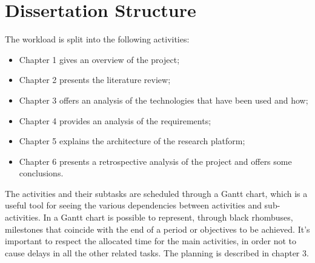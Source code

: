 \section{Dissertation Structure}
The workload is split into the following activities:
\begin{itemize}
	\item Chapter 1 gives an overview of the project;
	\item Chapter 2 presents the literature review;
	\item Chapter 3 offers an analysis of the technologies that have been used and how;
	\item Chapter 4 provides an analysis of the requirements;
	\item Chapter 5 explains the architecture of the research platform;
	\item Chapter 6 presents a retrospective analysis of the project and offers some conclusions.
\end{itemize}
The activities and their subtasks are scheduled through a Gantt chart, which is a useful tool for seeing the various dependencies between activities and sub-activities. In a Gantt chart is possible to represent, through black rhombuses, milestones that coincide with the end of a period or objectives to be achieved. It’s important to respect the allocated time for the main activities, in order not to cause delays in all the other related tasks. The planning is described in chapter 3.






